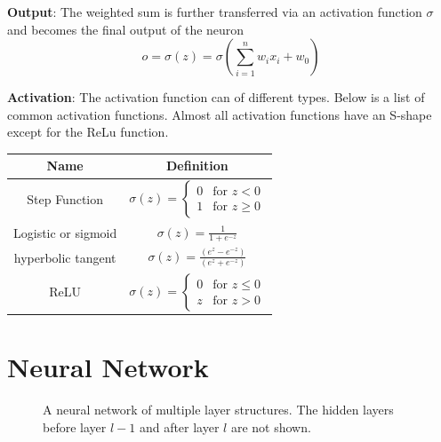 \documentclass[12pt, oneside]{article}
\begin{document}
\textbf{Output}: The weighted sum is further transferred via an activation function $\sigma$ and becomes the final output of the neuron
\begin{equation}
o=\sigma(z)=\sigma(\sum\limits_{i=1}^{n}w_i x_i+w_0)
\end{equation}

\textbf{Activation}: The activation function can of different types.  Below is a list of common activation functions. Almost all activation functions have an S-shape except for the ReLu function.
\begin{center}
\bgroup
\def\arraystretch{2.5}%
\begin{tabular}{c|c} 
Name & Definition\\
\hline
Step Function & $\sigma (z)={\begin{cases}0&{\text{for }}z<0\\1&{\text{for }}z\geq 0\end{cases}}$\\
\hline
Logistic or sigmoid & $\sigma(z)={\frac {1}{1+e^{-z}}}$\\
\hline
hyperbolic tangent &$\sigma(z)={\frac {(e^{z}-e^{-z})}{(e^{z}+e^{-z})}}$\\
\hline
ReLU & $\sigma(z)=\begin{cases}0&{\text{for }}z\leq 0\\z&{\text{for }}z>0\end{cases}$
\end{tabular}
\egroup
\end{center}


\section{Neural Network}
\begin{figure}

\caption{A neural network of multiple layer structures. The hidden layers before layer $l-1$ and after layer $l$ are not shown. }
\end{figure}
\end{document}

